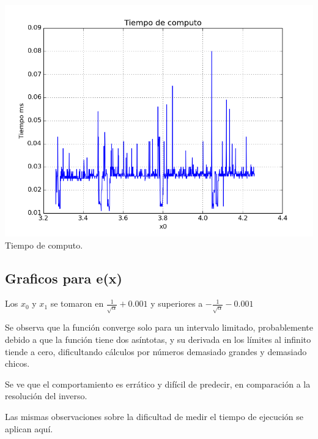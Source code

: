 \begin{center}
\includegraphics[scale=0.5]{graficos/tiempo-f-newton-alfa_fijo-absoluto-0.0001-alejando_cercano.png}\\
Tiempo de computo.
\end{center}

\subsection{Graficos para e(x)}

Los $x_0$ y $x_1$ se tomaron en $\frac{1}{\sqrt{\alpha}} + 0.001$ y superiores a $-\frac{1}{\sqrt{\alpha}} - 0.001$

Se observa que la función converge solo para un intervalo limitado, probablemente debido a que la función tiene dos asíntotas, y su derivada en los límites al infinito tiende a cero, dificultando cálculos por números demasiado grandes y demasiado chicos.

Se ve que el comportamiento es errático y difícil de predecir, en comparación a la resolución del inverso.

Las mismas observaciones sobre la dificultad de medir el tiempo de ejecución se aplican aquí.

